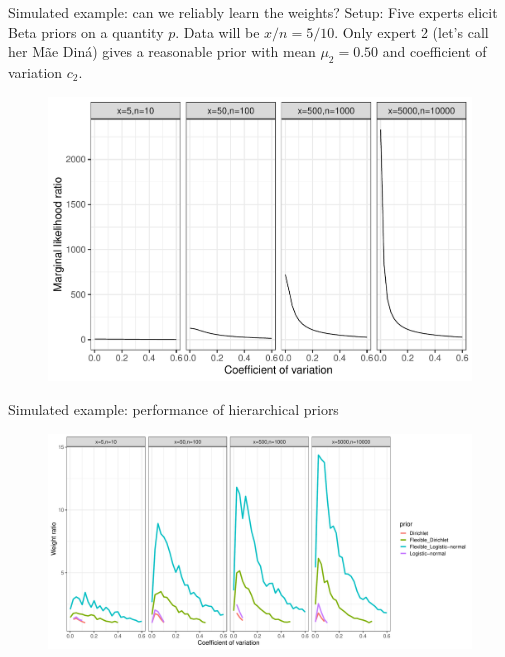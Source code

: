 \begin{frame}{Simulated example: can we reliably learn the weights?}
Setup:  Five experts elicit Beta priors on a quantity $p$. Data will be $x/n = 5/10$. Only expert 2 (let's call her Mãe Diná) gives a reasonable prior with mean $\mu_2 = 0.50$ and coefficient of variation $c_2$.
\begin{figure}[!ht]
\begin{center}
\includegraphics[scale=.40]{../plots/MaLs_ratios_oneCorrect.pdf}
\end{center}
\label{fig:one_correct_marglikes}
\end{figure}
\end{frame}
\begin{frame}{Simulated example: performance of hierarchical priors}
\begin{figure}[!ht]
\begin{center}
\includegraphics[scale=.30]{../plots/weight_ratios_oneCorrect.pdf}
\end{center}
\label{fig:one_correct_posteriors}
\end{figure}
\end{frame}

